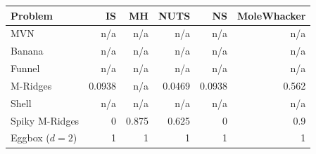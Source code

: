 \begin{tabular}{lrrrrr}
\toprule
Problem & IS & MH & NUTS & NS & MoleWhacker \\
\midrule
MVN & n/a & n/a & n/a & n/a & n/a \\
Banana & n/a & n/a & n/a & n/a & n/a \\
Funnel & n/a & n/a & n/a & n/a & n/a \\
M-Ridges & 0.0938 & n/a & 0.0469 & 0.0938 & 0.562 \\
Shell & n/a & n/a & n/a & n/a & n/a \\
Spiky M-Ridges & 0 & 0.875 & 0.625 & 0 & 0.9 \\
\midrule
Eggbox ($d=2$) & 1 & 1 & 1 & 1 & 1 \\
\bottomrule
\end{tabular}

